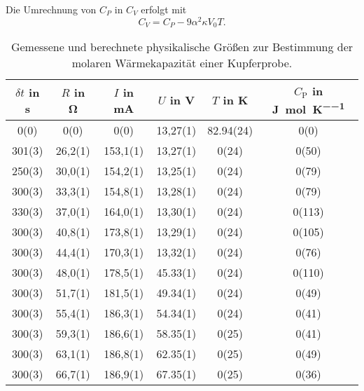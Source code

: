 Die Umrechnung von $C_P$ in $C_V$ erfolgt mit
\begin{equation}
  C_V = C_P-9\alpha ^2 \kappa V_0 T.
\end{equation}








\begin{table}[htb]
  \centering
  \caption{Gemessene und berechnete physikalische Größen zur Bestimmung der
  molaren Wärmekapazität einer Kupferprobe.}
  \begin{tabular}{S[table-format=2.2,separate-uncertainty,table-figures-uncertainty=1]
                  S[table-format=2.2,separate-uncertainty,table-figures-uncertainty=1]
                  S[table-format=2.2,separate-uncertainty,table-figures-uncertainty=1]
                  S[table-format=2.2,separate-uncertainty,table-figures-uncertainty=1]
                  S[table-format=2.2,separate-uncertainty,table-figures-uncertainty=1]
                  S[table-format=2.2,separate-uncertainty,table-figures-uncertainty=1]}
      \toprule
      {$\delta t$ in \si{\second}} & {$R$ in \si{\ohm}} & {$I$ in \si{\milli\ampere}} & {$U$ in \si{\volt}} & {$T$ in \si{\kelvin}} & {$C_{\mathrm{P}}$ in \si{\joule\per\mol\per\kelvin}} \\
      (0)  &   0(0)  &  0(0)    & 13,27(1) & 82.94(24)&	0(0)\\
      301(3)& 26,2(1) & 153,1(1) & 13,27(1)& 0(24)&	0(50)\\
      250(3)& 30,0(1) & 154,2(1) & 13,25(1) & 0(24)&	0(79)\\
      300(3)& 33,3(1) & 154,8(1) & 13,28(1) & 0(24)&	0(79)\\
      330(3)& 37,0(1) & 164,0(1) & 13,30(1) & 0(24)&	0(113)\\
      300(3)& 40,8(1) & 173,8(1) & 13,29(1) & 0(24)&	0(105)\\
      300(3)& 44,4(1) & 170,3(1) & 13,32(1) & 0(24)&	0(76)\\
      300(3)& 48,0(1) & 178,5(1) & 45.33(1) & 0(24)&	0(110)\\
      300(3)& 51,7(1) & 181,5(1) & 49.34(1) & 0(24)&	0(49)\\
      300(3)& 55,4(1) & 186,3(1) & 54.34(1) & 0(24)&	0(41)\\
      300(3)& 59,3(1) & 186,6(1) & 58.35(1) & 0(25)&	0(41)\\
      300(3)& 63,1(1) & 186,8(1) & 62.35(1) & 0(25)&	0(49)\\
      300(3)& 66,7(1) & 186,9(1) & 67.35(1) & 0(25)&	0(36)\\

\end{tabular}
\end{table}

